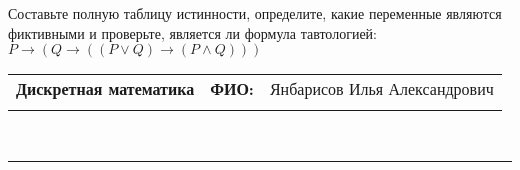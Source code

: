 \documentclass[10pt]{exam}
\newcommand{\class}{Дискретная математика}
\newcommand{\examdate}{}
\begin{document}
\begin{questions}
\begin{enumerate}[a)]
\end{enumerate}\question Составьте полную таблицу истинности, определите, какие переменные являются фиктивными и проверьте, является ли формула тавтологией:
$ P \rightarrow (Q \rightarrow ((P \lor Q) \rightarrow (P \land Q)))$

\end{questions}
\newpage
\begin{flushright}
\begin{tabular}{p{2.8in} r l}
\textbf{\class} & \textbf{ФИО:} &Янбарисов Илья Александрович
\\

\textbf{\examdate} &&\\
\end{tabular}\\
\end{flushright}
\rule[1ex]{\textwidth}{.1pt}
\end{document}
